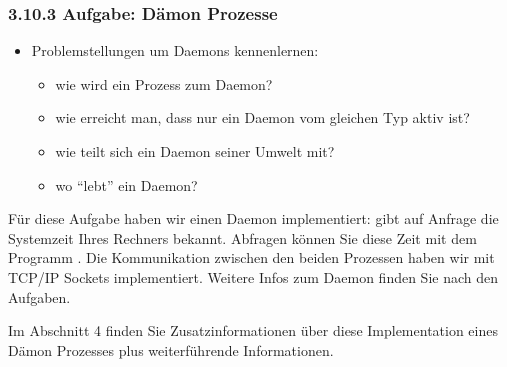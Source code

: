 \documentclass[a4paper,10pt,english]{report}
\begin{document}
\subsubsection{3.10.3 Aufgabe: Dämon Prozesse}
\label{\detokenize{P07_Prozesse_und_Threads/README:aufgabe-damon-prozesse}}
\sphinxAtStartPar
{}
\begin{itemize}
\item {} 
\sphinxAtStartPar
Problemstellungen um Daemons kennenlernen:
\begin{itemize}
\item {} 
\sphinxAtStartPar
wie wird ein Prozess zum Daemon?

\item {} 
\sphinxAtStartPar
wie erreicht man, dass nur ein Daemon vom gleichen Typ aktiv ist?

\item {} 
\sphinxAtStartPar
wie teilt sich ein Daemon seiner Umwelt mit?

\item {} 
\sphinxAtStartPar
wo “lebt” ein Daemon?

\end{itemize}

\end{itemize}

\sphinxAtStartPar
{}

\sphinxAtStartPar
Für diese Aufgabe haben wir einen Daemon implementiert:  gibt auf Anfrage die Systemzeit Ihres Rechners bekannt. Abfragen können Sie diese Zeit mit dem Programm . Die Kommunikation zwischen den beiden Prozessen haben wir mit TCP/IP Sockets implementiert. Weitere Infos zum Daemon finden Sie nach den Aufgaben.

\sphinxAtStartPar
Im Abschnitt 4 finden Sie Zusatzinformationen über diese Implementation eines Dämon Prozesses plus weiterführende Informationen.
\end{document}
